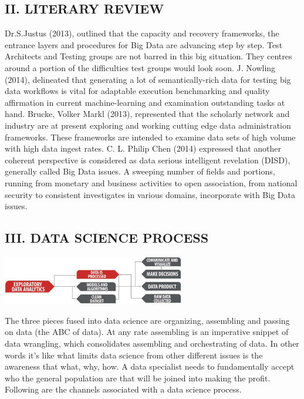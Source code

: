 \documentclass[a4paper]{article}
\begin{document}
\begin{multicols}{2}
\subsection*{II. LITERARY REVIEW}
Dr.S.Justus (2013), outlined that the capacity and recovery
frameworks, the entrance layers and procedures for Big Data
are advancing step by step. Test Architects and Testing groups
are not barred in this big situation. They centres around a
portion of the difficulties test groups would look soon. J.
Nowling (2014), delineated that generating a lot of
semantically-rich data for testing big data workflows is vital
for adaptable execution benchmarking and quality affirmation
in current machine-learning and examination outstanding tasks
at hand. Brucke, Volker Markl (2013), represented that the
scholarly network and industry are at present exploring and
working cutting edge data administration frameworks. These
frameworks are intended to examine data sets of high volume
with high data ingest rates. C. L. Philip Chen (2014) expressed
that another coherent perspective is considered as data serious
intelligent revelation (DISD), generally called Big Data issues.
A sweeping number of fields and portions, running from
monetary and business activities to open association, from
national security to consistent investigates in various domains,
incorporate with Big Data issues.

\subsection*{III. DATA SCIENCE PROCESS}
\noindent 
    \begin{minipage}{\linewidth}
      \centering
      \includegraphics[width= 8cm]{fig1}
    \end{minipage}


\vspace{10pt}
The three pieces fused into data science are organizing,
assembling and passing on data (the ABC of data). At any rate
assembling is an imperative snippet of data wrangling, which
consolidates assembling and orchestrating of data. In other
words it’s like what limits data science from other different
issues is the awareness that what, why, how. A data specialist
needs to fundamentally accept who the general population are
that will be joined into making the profit. Following are the
channels associated with a data science process.  \\


\end{multicols}
\end{document}
